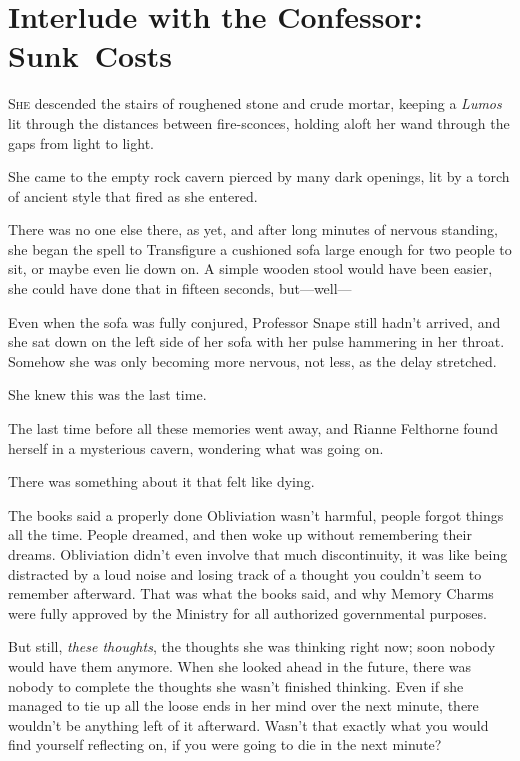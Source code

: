 \chapter{Interlude with the Confessor: Sunk~Costs}

\lettrine{S}{he} descended the stairs of roughened stone and crude mortar, keeping a \emph{Lumos} lit through the distances between fire-sconces, holding aloft her wand through the gaps from light to light.

She came to the empty rock cavern pierced by many dark openings, lit by a torch of ancient style that fired as she entered.

There was no one else there, as yet, and after long minutes of nervous standing, she began the spell to Transfigure a cushioned sofa large enough for two people to sit, or maybe even lie down on. A simple wooden stool would have been easier, she could have done that in fifteen seconds, but—well—

Even when the sofa was fully conjured, Professor Snape still hadn’t arrived, and she sat down on the left side of her sofa with her pulse hammering in her throat. Somehow she was only becoming more nervous, not less, as the delay stretched.

She knew this was the last time.

The last time before all these memories went away, and Rianne Felthorne found herself in a mysterious cavern, wondering what was going on.

There was something about it that felt like dying.

The books said a properly done Obliviation wasn’t harmful, people forgot things all the time. People dreamed, and then woke up without remembering their dreams. Obliviation didn’t even involve that much discontinuity, it was like being distracted by a loud noise and losing track of a thought you couldn’t seem to remember afterward. That was what the books said, and why Memory Charms were fully approved by the Ministry for all authorized governmental purposes.

But still, \emph{these thoughts}, the thoughts she was thinking right now; soon nobody would have them anymore. When she looked ahead in the future, there was nobody to complete the thoughts she wasn’t finished thinking. Even if she managed to tie up all the loose ends in her mind over the next minute, there wouldn’t be anything left of it afterward. Wasn’t that exactly what you would find yourself reflecting on, if you were going to die in the next minute?


